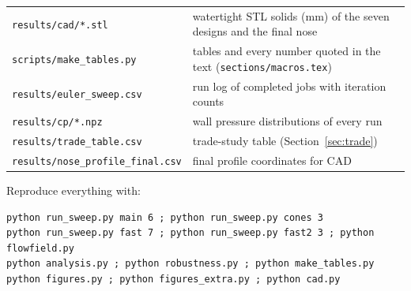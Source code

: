 \begin{table}[H]
\begin{tabular}{@{}lp{10.2cm}@{}}
\texttt{results/cad/*.stl} & watertight STL solids (mm) of the seven designs and the final nose \\
\texttt{scripts/make\_tables.py} & tables and every number quoted in the text (\texttt{sections/macros.tex}) \\
\texttt{results/euler\_sweep.csv} & run log of completed jobs with iteration counts \\
\texttt{results/cp/*.npz} & wall pressure distributions of every run \\
\texttt{results/trade\_table.csv} & trade-study table (Section~\ref{sec:trade}) \\
\texttt{results/nose\_profile\_final.csv} & final profile coordinates for CAD \\
\bottomrule
\end{tabular}
\end{table}

Reproduce everything with:
\begin{verbatim}
python run_sweep.py main 6 ; python run_sweep.py cones 3
python run_sweep.py fast 7 ; python run_sweep.py fast2 3 ; python flowfield.py
python analysis.py ; python robustness.py ; python make_tables.py
python figures.py ; python figures_extra.py ; python cad.py
\end{verbatim}
